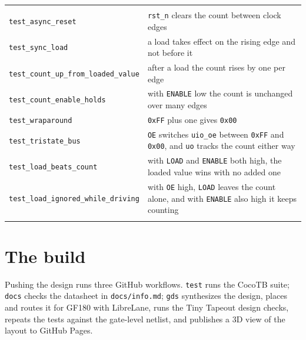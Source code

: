 \documentclass[11pt]{article}
\begin{document}
\begin{hsblock}
\par\vspace{4pt}
\begin{tabularx}{\linewidth}{@{}L{172pt}Y@{}}
\hstoprule
{} &  \\
\hstoprule
\texttt{test\_async\_reset} & \texttt{rst\_n} clears the count between clock edges \\ \hline
\texttt{test\_sync\_load} & a load takes effect on the rising edge and not before it \\ \hline
\texttt{test\_count\_up\_from\_loaded\_value} & after a load the count rises by one per edge \\ \hline
\texttt{test\_count\_enable\_holds} & with \texttt{ENABLE} low the count is unchanged over many edges \\ \hline
\texttt{test\_wraparound} & \texttt{0xFF} plus one gives \texttt{0x00} \\ \hline
\texttt{test\_tristate\_bus} & \texttt{OE} switches \texttt{uio\_oe} between \texttt{0xFF} and \texttt{0x00}, and \texttt{uo} tracks the count either way \\ \hline
\texttt{test\_load\_beats\_count} & with \texttt{LOAD} and \texttt{ENABLE} both high, the loaded value wins with no added one \\ \hline
\texttt{test\_load\_ignored\_while\_driving} & with \texttt{OE} high, \texttt{LOAD} leaves the count alone, and with \texttt{ENABLE} also high it keeps counting \\
\hstoprule
\end{tabularx}
\end{hsblock}

\newpage

\section{The build}\label{sec:build}

Pushing the design runs three GitHub workflows. \texttt{test} runs the CocoTB suite;
\texttt{docs} checks the datasheet in \texttt{docs/info.md}; \texttt{gds} synthesizes the design,
places and routes it for GF180 with LibreLane, runs the Tiny Tapeout design checks, repeats the
tests against the gate-level netlist, and publishes a 3D view of the layout to GitHub Pages.
\end{document}
